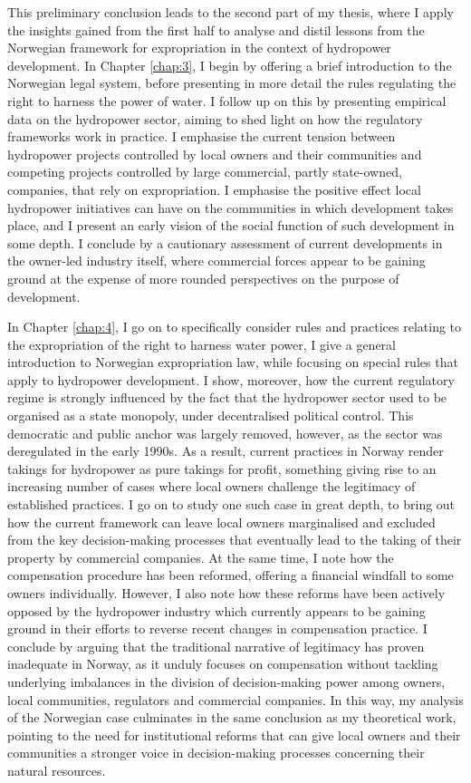 {This preliminary conclusion leads to the second part of my thesis, where I apply the insights gained from the first half to analyse and distil lessons from the Norwegian framework for expropriation in the context of hydropower development. In Chapter \ref{chap:3}, I begin by offering a brief introduction to the Norwegian legal system, before presenting in more detail the rules regulating the right to harness the power of water. I follow up on this by presenting empirical data on the hydropower sector, aiming to shed light on how the regulatory frameworks work in practice. I emphasise the current tension between hydropower projects controlled by local owners and their communities and competing projects controlled by large commercial, partly state-owned, companies, that rely on expropriation. I emphasise the positive effect local hydropower initiatives can have on the communities in which development takes place, and I present an early vision of the social function of such development in some depth. I conclude by a cautionary assessment of current developments in the owner-led industry itself, where commercial forces appear to be gaining ground at the expense of more rounded perspectives on the purpose of development.

In Chapter \ref{chap:4}, I go on to specifically consider rules and practices relating to the expropriation of the right to harness water power, I give a general introduction to Norwegian expropriation law, while focusing on special rules that apply to hydropower development. I show, moreover, how the current regulatory regime is strongly influenced by the fact that the hydropower sector used to be organised as a state monopoly, under decentralised political control. This democratic and public anchor was largely removed, however, as the sector was deregulated in the early 1990s. As a result, current practices in Norway render takings for hydropower as pure takings for profit, something giving rise to an increasing number of cases where local owners challenge the legitimacy of established practices. I go on to study one such case in great depth, to bring out how the current framework can leave local owners marginalised and excluded from the key decision-making processes that eventually lead to the taking of their property by commercial companies. At the same time, I note how the compensation procedure has been reformed, offering a financial windfall to some owners individually. However, I also note how these reforms have been actively opposed by the hydropower industry which currently appears to be gaining ground in their efforts to reverse recent changes in compensation practice. I conclude by arguing that the traditional narrative of legitimacy has proven inadequate in Norway, as it unduly focuses on compensation without tackling underlying imbalances in the division of decision-making power among owners, local communities, regulators and commercial companies. In this way, my analysis of the Norwegian case culminates in the same conclusion as my theoretical work, pointing to the need for institutional reforms that can give local owners and their communities a stronger voice in decision-making processes concerning their natural resources.

}
